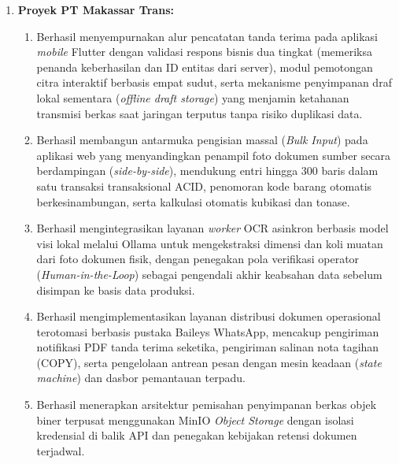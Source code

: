 \begin{enumerate}[label=\arabic*., leftmargin=*, itemsep=0pt]
  \item \textbf{Proyek PT Makassar Trans:}
  \begin{enumerate}[label=\alph*., leftmargin=*, itemsep=0pt]
    \item Berhasil menyempurnakan alur pencatatan tanda terima pada aplikasi \textit{mobile} Flutter dengan validasi respons bisnis dua tingkat (memeriksa penanda keberhasilan dan ID entitas dari server), modul pemotongan citra interaktif berbasis empat sudut, serta mekanisme penyimpanan draf lokal sementara (\textit{offline draft storage}) yang menjamin ketahanan transmisi berkas saat jaringan terputus tanpa risiko duplikasi data.
    \item Berhasil membangun antarmuka pengisian massal (\textit{Bulk Input}) pada aplikasi web yang menyandingkan penampil foto dokumen sumber secara berdampingan (\textit{side-by-side}), mendukung entri hingga 300 baris dalam satu transaksi transaksional ACID, penomoran kode barang otomatis berkesinambungan, serta kalkulasi otomatis kubikasi dan tonase.
    \item Berhasil mengintegrasikan layanan \textit{worker} OCR asinkron berbasis model visi lokal melalui Ollama untuk mengekstraksi dimensi dan koli muatan dari foto dokumen fisik, dengan penegakan pola verifikasi operator (\textit{Human-in-the-Loop}) sebagai pengendali akhir keabsahan data sebelum disimpan ke basis data produksi.
    \item Berhasil mengimplementasikan layanan distribusi dokumen operasional terotomasi berbasis pustaka Baileys WhatsApp, mencakup pengiriman notifikasi PDF tanda terima seketika, pengiriman salinan nota tagihan (COPY), serta pengelolaan antrean pesan dengan mesin keadaan (\textit{state machine}) dan dasbor pemantauan terpadu.
    \item Berhasil menerapkan arsitektur pemisahan penyimpanan berkas objek biner terpusat menggunakan MinIO \textit{Object Storage} dengan isolasi kredensial di balik API dan penegakan kebijakan retensi dokumen terjadwal.
  \end{enumerate}


\end{enumerate}
